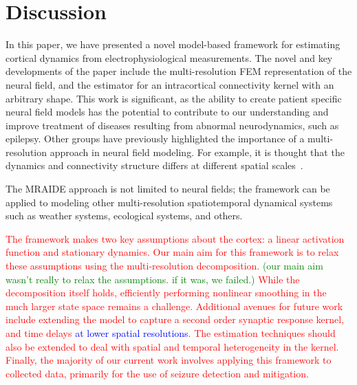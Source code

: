 \documentclass[journal]{IEEEtran}
\newcommand{\mike}[1]{\textcolor{red}{#1}}
\newcommand{\dean}[1]{\textcolor{green}{#1}}
\newcommand{\parham}[1]{\textcolor{blue}{#1}}
\newcommand{\ken}[1]{\textsf{\emph{\textbf{\textcolor{magenta}{#1}}}}}
\begin{document}
\section{Discussion}
In this paper, we have presented a novel model-based framework for estimating cortical dynamics from electrophysiological measurements. The novel and key developments of the paper include the multi-resolution FEM representation of the neural field, and the estimator for an intracortical connectivity kernel with an arbitrary shape. This work is significant, as the ability to create patient specific neural field models has the potential to contribute to our understanding and improve treatment of diseases resulting from abnormal neurodynamics, such as epilepsy. Other groups have previously highlighted the importance of a multi-resolution approach in neural field modeling. For example, it is thought that the dynamics and connectivity structure differs at different spatial scales~\cite{Qubbaj2009}.

The MRAIDE approach is not limited to neural fields; the framework can be applied to modeling other multi-resolution spatiotemporal dynamical systems such as weather systems, ecological systems, and others\cite{Wikle2002,Xu2005,Fort2008}. 

  \mike{The framework makes two key assumptions about the cortex: a linear activation function and stationary dynamics. Our main aim for this framework is to relax these assumptions using the multi-resolution decomposition. \dean{(our main aim wasn't really to relax the assumptions. if it was, we failed.)} While the decomposition itself holds, efficiently performing nonlinear smoothing in the much larger state space remains a challenge. Additional avenues for future work include extending the model to capture a second order synaptic response kernel, and time delays \parham{at lower spatial resolutions}.  The estimation techniques should also be extended to deal with spatial and temporal heterogeneity in the kernel. Finally, the majority of our current work involves applying this framework to collected data, primarily for the use of seizure detection and mitigation.}
\end{document}

